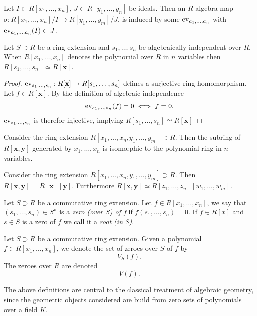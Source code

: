 \begin{corollary}
    Let $I\subset R[x_1,\dots,x_n]$, $J\subset R[y_1,\dots,y_n]$ be ideals. Then an $R$-algebra map $\sigma:R[x_1,\dots,x_n]/I\rightarrow R[y_1,\dots,y_m]/J$, is induced by some $\mathrm{ev}_{a_1,\dots,a_n}$ with $\mathrm{ev}_{a_1,\dots,a_n}(I)\subset J$. 
\end{corollary}
\begin{lemma}
    Let $S\supset R$ be a ring extension and $s_1,\dots,s_n$ be algebraically independent over $R$. When $R[x_1,\dots,x_n]$ denotes the polynomial over $R$ in $n$ variables then $R[s_1,\dots,s_n]\simeq R[\mathbf{x}]$.
\end{lemma}
\begin{proof}
    $\mathrm{ev}_{s_1,\dots,s_n} : R[\mathbf{x}]\rightarrow R[s_1,\dots,s_n]$ defines a surjective ring homomorphism. Let $f\in R[\mathbf{x}]$. By the definition of algebraic independence 
    $$
        \mathrm{ev}_{s_1,\dots,s_n}(f)=0 \iff f = 0.
    $$ 
    $\mathrm{ev}_{s_1,\dots,s_n}$ is therefor injective, implying $R[s_1,\dots,s_n]\simeq R[\mathbf{x}]$
\end{proof}
\begin{corollary}
    Consider the ring extension $R[x_1,\dots,x_n,y_1,\dots,y_m]\supset R$. Then the subring of $R[\mathbf{x},\mathbf{y}]$ generated by $x_1,\dots,x_n$ is isomorphic to the polynomial ring in $n$ variables. 
\end{corollary}
\begin{corollary}
    Consider the ring extension $R[x_1,\dots,x_n,y_1,\dots,y_m]\supset R$. Then $R[\mathbf{x},\mathbf{y}]=R[\mathbf{x}][\mathbf{y}]$. Furthermore $R[\mathbf{x},\mathbf{y}]\simeq R[z_1,\dots,z_n][w_1,\dots,w_m]$.
\end{corollary}
\begin{definition}
    Let $S\supset R$ be a commutative ring extension. Let $f\in R[x_1,\dots,x_n]$, we say that $(s_1,\dots, s_n)\in S^n$ is a \textit{zero (over $S$) of $f$} if $f(s_1,\dots,s_n)= 0$. If $f\in R[x]$ and $s\in S$ is a zero of $f$ we call it a \textit{root (in $S$)}.\\  
\end{definition}
\begin{definition}
    Let $S\supset R$ be a commutative ring extension. Given a polynomial $f\in R[x_1,\dots,x_n]$, we denote the set of zeroes over $S$ of $f$ by 
    $$V_S(f).$$
    The zeroes over $R$ are denoted 
    $$
        V(f).
    $$
\end{definition}
The above definitions are central to the classical treatment of algebraic geometry, since the geometric objects considered are build from zero sets of polynomials over a field $K$. 
